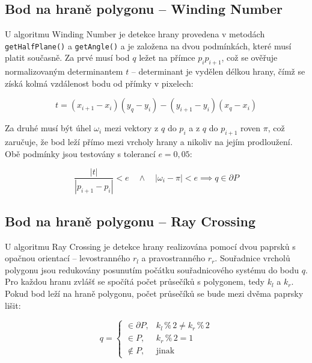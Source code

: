 \documentclass[11pt, a4paper]{article}
\begin{document}
\subsection{Bod na hraně polygonu -- Winding Number}

U algoritmu Winding Number je detekce hrany provedena v metodách \texttt{getHalfPlane()} a \texttt{getAngle()} a je založena na dvou podmínkách, které musí platit současně. Za prvé musí bod $q$ ležet na přímce $p_i p_{i+1}$, což se ověřuje normalizovaným determinantem $t$ -- determinant je vydělen délkou hrany, čímž se získá kolmá vzdálenost bodu od přímky v pixelech:

\begin{equation}
    t = (x_{i+1} - x_i)(y_q - y_i) - (y_{i+1} - y_i)(x_q - x_i)
\end{equation}

Za druhé musí být úhel $\omega_i$ mezi vektory z $q$ do $p_i$ a z $q$ do $p_{i+1}$ roven $\pi$, což zaručuje, že bod leží přímo mezi vrcholy hrany a nikoliv na jejím prodloužení. Obě podmínky jsou testovány s tolerancí $e = 0{,}05$:

\begin{equation}
    \frac{|t|}{|p_{i+1} - p_i|} < e \quad \wedge \quad |\omega_i - \pi| < e \implies q \in \partial P
\end{equation}

\subsection{Bod na hraně polygonu -- Ray Crossing}


U algoritmu Ray Crossing je detekce hrany realizována pomocí dvou paprsků s opačnou orientací -- levostranného $r_l$ a pravostranného $r_r$. Souřadnice vrcholů polygonu jsou redukovány posunutím počátku souřadnicového systému do bodu $q$. Pro každou hranu zvlášť se spočítá počet průsečíků s polygonem, tedy $k_l$ a $k_r$. Pokud bod leží na hraně polygonu, počet průsečíků se bude mezi dvěma paprsky lišit:

\begin{equation}
    q =
    \begin{cases}
        \in \partial P, & k_l\,\%\,2 \neq k_r\,\%\,2 \\
        \in P,          & k_r\,\%\,2 = 1 \\
        \notin P,       & \text{jinak}
    \end{cases}
\end{equation}
\end{document}
